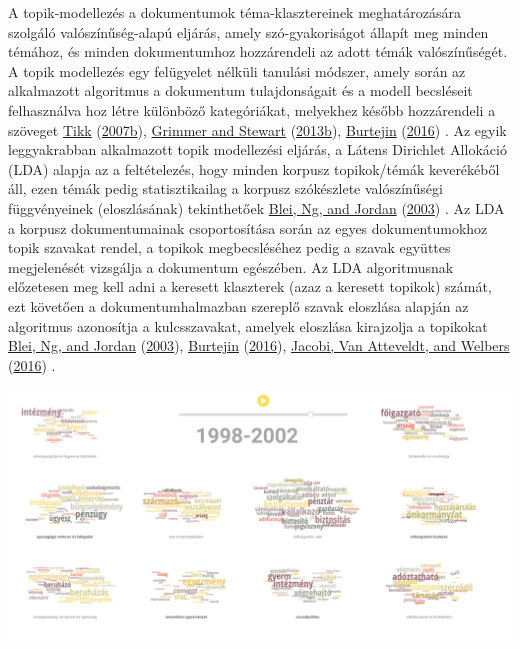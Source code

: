\documentclass[
]{book}
\begin{document}
A topik-modellezés a dokumentumok téma-klasztereinek meghatározására
szolgáló valószínűség-alapú eljárás, amely szó-gyakoriságot állapít meg
minden témához, és minden dokumentumhoz hozzárendeli az adott témák
valószínűségét. A topik modellezés egy felügyelet nélküli tanulási
módszer, amely során az alkalmazott algoritmus a dokumentum
tulajdonságait és a modell becsléseit felhasználva hoz létre különböző
kategóriákat, melyekhez később hozzárendeli a szöveget
\protect\hyperlink{ref-tikk2007a}{Tikk}
(\protect\hyperlink{ref-tikk2007a}{2007b}),
\protect\hyperlink{ref-grimmer2013texta}{Grimmer and Stewart}
(\protect\hyperlink{ref-grimmer2013texta}{2013b}),
\protect\hyperlink{ref-burtejin2016}{Burtejin}
(\protect\hyperlink{ref-burtejin2016}{2016}) . Az egyik leggyakrabban
alkalmazott topik modellezési eljárás, a Látens Dirichlet Allokáció
(LDA) alapja az a feltételezés, hogy minden korpusz topikok/témák
keverékéből áll, ezen témák pedig statisztikailag a korpusz szókészlete
valószínűségi függvényeinek (eloszlásának) tekinthetőek
\protect\hyperlink{ref-blei2003}{Blei, Ng, and Jordan}
(\protect\hyperlink{ref-blei2003}{2003}) . Az LDA a korpusz
dokumentumainak csoportosítása során az egyes dokumentumokhoz topik
szavakat rendel, a topikok megbecsléséhez pedig a szavak együttes
megjelenését vizsgálja a dokumentum egészében. Az LDA algoritmusnak
előzetesen meg kell adni a keresett klaszterek (azaz a keresett topikok)
számát, ezt követően a dokumentumhalmazban szereplő szavak eloszlása
alapján az algoritmus azonosítja a kulcsszavakat, amelyek eloszlása
kirajzolja a topikokat \protect\hyperlink{ref-blei2003}{Blei, Ng, and
Jordan} (\protect\hyperlink{ref-blei2003}{2003}),
\protect\hyperlink{ref-burtejin2016}{Burtejin}
(\protect\hyperlink{ref-burtejin2016}{2016}),
\protect\hyperlink{ref-jacobi2016a}{Jacobi, Van Atteveldt, and Welbers}
(\protect\hyperlink{ref-jacobi2016a}{2016}) .

\begin{center}\includegraphics[width=0.9\linewidth]{figures/08-01_topik_modell} \end{center}
\end{document}
